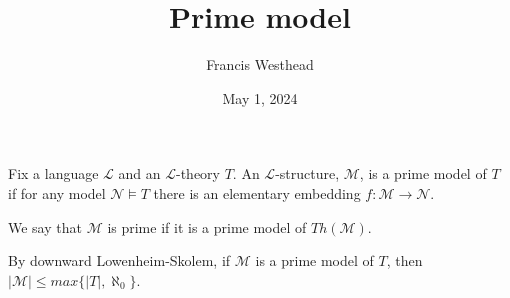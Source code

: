 \documentclass[a4paper]{article}
\title{Prime model}
\date{May 1, 2024}
\author{Francis Westhead}
\begin{document}
\maketitle
\par{Fix a language \(\mathcal {L}\) and an \(\mathcal {L}\)-theory \(T\). 
An \(\mathcal {L}\)-structure, \(\mathcal {M}\), is a prime model of \(T\) if for any model \(\mathcal {N}  \models  T\)
there is an elementary embedding \(f:  \mathcal {M}  \rightarrow   \mathcal {N}\).}\par{We say that \(\mathcal {M}\) is prime if it is a prime model of \(Th( \mathcal {M})\).}\par{By downward Lowenheim-Skolem, if \(\mathcal {M}\) is a prime model of \(T\), then \(| \mathcal {M}| \leq  max \{ |T|,  \aleph _0 \}\).}
\printbibliography
\end{document}
